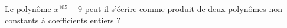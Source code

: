 Le polynôme $x^{105} - 9$ peut-il s'écrire comme produit de deux polynômes non constants à coefficients entiers ?
